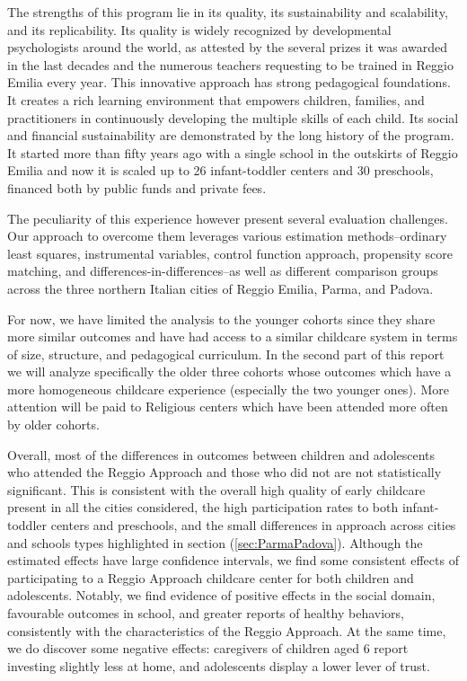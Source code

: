 \documentclass[12pt]{article}
\begin{document}
The strengths of this program lie in its quality, its sustainability and scalability, and its replicability. Its quality is widely recognized by developmental psychologists around the world, as attested by the several prizes it was awarded in the last decades and the numerous teachers requesting to be trained in Reggio Emilia every year. This innovative approach has strong pedagogical foundations. It creates a rich learning environment that empowers children, families, and practitioners in continuously developing the multiple skills of each child. Its social and financial sustainability are demonstrated by the long history of the program. It started more than fifty years ago with a single school in the outskirts of Reggio Emilia and now it is scaled up to 26 infant-toddler centers and 30 preschools, financed both by public funds and private fees.

The peculiarity of this experience however present several evaluation challenges. Our approach to overcome them leverages various estimation methods--ordinary least squares, instrumental variables, control function approach, propensity score matching, and differences-in-differences--as well as different comparison groups across the three northern Italian cities of Reggio Emilia, Parma, and Padova.

For now, we have limited the analysis to the younger cohorts since they share more similar outcomes and have had access to a similar childcare system in terms of size, structure, and pedagogical curriculum. In the second part of this report we will analyze specifically the older three cohorts whose outcomes which have a more homogeneous childcare experience (especially the two younger ones). More attention will be paid to Religious centers which have been attended more often by older cohorts.

Overall, most of the differences in outcomes between children and adolescents who attended the Reggio Approach and those who did not are not statistically significant. This is consistent with the overall high quality of early childcare present in all the cities considered, the high participation rates to both infant-toddler centers and preschools, and the small differences in approach across cities and schools types highlighted in section (\ref{sec:ParmaPadova}). 
Although the estimated effects have large confidence intervals, we find some consistent effects of participating to a Reggio Approach childcare center for both children and adolescents. Notably, we find evidence of positive effects in the social domain, favourable outcomes in school, and greater reports of healthy behaviors, consistently with the characteristics of the Reggio Approach. At the same time, we do discover some negative effects: caregivers of children aged 6 report investing slightly less at home, and adolescents display a lower lever of trust.

\pagebreak



\begin{appendices}
\label{sec:Appendix}

\end{appendices}
\end{document}
